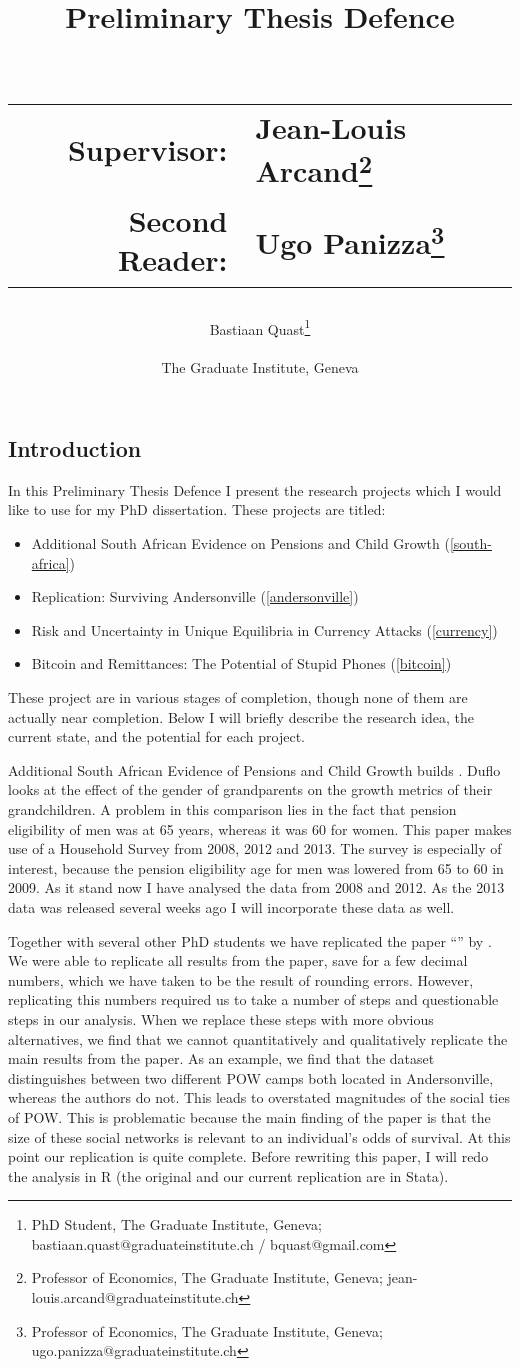 \documentclass[a4paper]{report}\usepackage{graphicx, color}
\title{Preliminary Thesis Defence\\~\\
\begin{tabular}{rl}
Supervisor:&Jean-Louis Arcand\footnote{Professor of Economics, The Graduate Institute, Geneva; jean-louis.arcand@graduateinstitute.ch}\\
Second Reader:&Ugo Panizza\footnote{Professor of Economics, The Graduate Institute, Geneva; ugo.panizza@graduateinstitute.ch}
\end{tabular}
}
\author{Bastiaan Quast\thanks{PhD Student, The Graduate Institute, Geneva; bastiaan.quast@graduateinstitute.ch / bquast@gmail.com}\\~\\
The Graduate Institute, Geneva}
\begin{document}
\maketitle
\tableofcontents
\listoftables
\listoffigures

\begin{refsection}
\chapter{Introduction}
In this Preliminary Thesis Defence I present the research projects which I would like to use for my PhD dissertation. These projects are titled:

\begin{itemize}
\item Additional South African Evidence on Pensions and Child Growth (\ref{south-africa})
\item Replication: Surviving Andersonville (\ref{andersonville})
\item Risk and Uncertainty in Unique Equilibria in Currency Attacks (\ref{currency})
\item Bitcoin and Remittances: The Potential of Stupid Phones (\ref{bitcoin})
\end{itemize}

These project are in various stages of completion, though none of them are actually near completion. Below I will briefly describe the research idea, the current state, and the potential for each project.

Additional South African Evidence of Pensions and Child Growth builds \textcite{duflo2000, duflo2003}. Duflo looks at the effect of the gender of grandparents on the growth metrics of their grandchildren. A problem in this comparison lies in the fact that pension eligibility of men was at 65 years, whereas it was 60 for women. This paper makes use of a Household Survey from 2008, 2012 and 2013. The survey is especially of interest, because the pension eligibility age for men was lowered from 65 to 60 in 2009. As it stand now I have analysed the data from 2008 and 2012. As the 2013 data was released several weeks ago I will incorporate these data as well.

Together with several other PhD students we have replicated the paper ``'' by \textcite{costa2007surviving}. We were able to replicate all results from the paper, save for a few decimal numbers, which we have taken to be the result of rounding errors. However, replicating this numbers required us to take a number of steps and questionable steps in our analysis. When we replace these steps with more obvious alternatives, we find that we cannot quantitatively and qualitatively replicate the main results from the paper. As an example, we find that the dataset distinguishes between two different POW camps both located in Andersonville, whereas the authors do not. This leads to overstated magnitudes of the social ties of POW. This is problematic because the main finding of the paper is that the size of these social networks is relevant to an individual's odds of survival. At this point our replication is quite complete. Before rewriting this paper, I will redo the analysis in R (the original and our current replication are in Stata).


\end{refsection}
\end{document}
